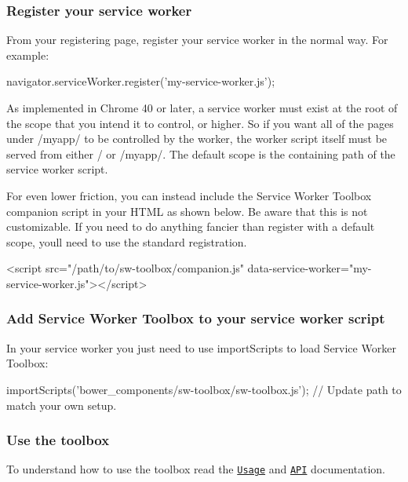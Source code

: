 \subsubsection*{Register your service worker}

From your registering page, register your service worker in the normal way. For example\+:


\begin{DoxyCode}
navigator.serviceWorker.register('my-service-worker.js');
\end{DoxyCode}


As implemented in Chrome 40 or later, a service worker must exist at the root of the scope that you intend it to control, or higher. So if you want all of the pages under {\ttfamily /myapp/} to be controlled by the worker, the worker script itself must be served from either {\ttfamily /} or {\ttfamily /myapp/}. The default scope is the containing path of the service worker script.

For even lower friction, you can instead include the Service Worker Toolbox companion script in your H\+T\+ML as shown below. Be aware that this is not customizable. If you need to do anything fancier than register with a default scope, you\textquotesingle{}ll need to use the standard registration.


\begin{DoxyCode}
<script src="/path/to/sw-toolbox/companion.js" data-service-worker="my-service-worker.js"></script>
\end{DoxyCode}


\subsubsection*{Add Service Worker Toolbox to your service worker script}

In your service worker you just need to use {\ttfamily import\+Scripts} to load Service Worker Toolbox\+:


\begin{DoxyCode}
importScripts('bower\_components/sw-toolbox/sw-toolbox.js');  // Update path to match your own setup.
\end{DoxyCode}


\subsubsection*{Use the toolbox}

To understand how to use the toolbox read the \href{https://googlechrome.github.io/sw-toolbox/usage.html#main}{\tt Usage} and \href{https://googlechrome.github.io/sw-toolbox/api.html#main}{\tt A\+PI} documentation.

